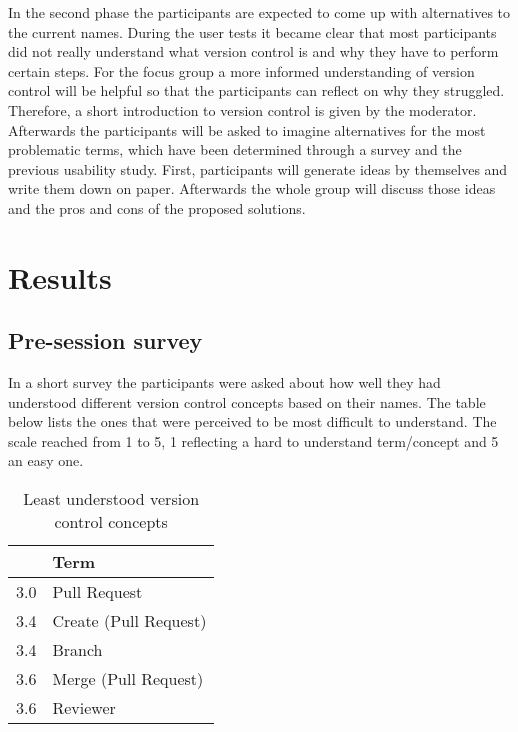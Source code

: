 In the second phase the participants are expected to come up with alternatives to the current names. During the user tests it became clear that most participants did not really understand what version control is and why they have to perform certain steps. For the focus group a more informed understanding of version control will be helpful so that the participants can reflect on why they struggled. Therefore, a short introduction to version control is given by the moderator. Afterwards the participants will be asked to imagine alternatives for the most problematic terms, which have been determined through a survey and the previous usability study. First, participants will generate ideas by themselves and write them down on paper. Afterwards the whole group will discuss those ideas and the pros and cons of the proposed solutions.

\section{Results}

\subsection{Pre-session survey}
In a short survey the participants were asked about how well they had understood different version control concepts based on their names. The table below lists the ones that were perceived to be most difficult to understand. The scale reached from 1 to 5, 1 reflecting a hard to understand term/concept and 5 an easy one.  

\begin{table}[h!]
\begin{tabular}{|r|l|}
\hline
\rowcolor[HTML]{EFEFEF} 
\multicolumn{1}{|l|}{\cellcolor[HTML]{EFEFEF}{\bf Score (mean)}} & {\bf Term}            \\ \hline
3.0                                                              & Pull Request          \\ \hline
3.4                                                              & Create (Pull Request) \\ \hline
3.4                                                              & Branch                \\ \hline
3.6                                                              & Merge (Pull Request)  \\ \hline
3.6                                                              & Reviewer              \\ \hline
\end{tabular}
\centering
\caption{Least understood version control concepts}
\label{table:concept-ratings}
\end{table}


